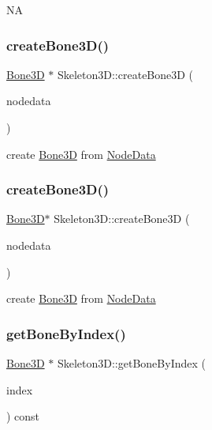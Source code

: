 NA \mbox{\label{classSkeleton3D_a478970d2b905bd5ea08e6cb175845573}} 
\subsubsection{\texorpdfstring{create\+Bone3\+D()}{createBone3D()}\hspace{0.1cm}{\footnotesize\ttfamily [1/2]}}
{\footnotesize\ttfamily \hyperlink{classBone3D}{Bone3D} $\ast$ Skeleton3\+D\+::create\+Bone3D (\begin{DoxyParamCaption}\item[{const \hyperlink{structNodeData}{Node\+Data} \&}]{nodedata }\end{DoxyParamCaption})}

create \hyperlink{classBone3D}{Bone3D} from \hyperlink{structNodeData}{Node\+Data} \mbox{\label{classSkeleton3D_a0438e32f80ad0bc06cf0617cc0a7965b}} 
\subsubsection{\texorpdfstring{create\+Bone3\+D()}{createBone3D()}\hspace{0.1cm}{\footnotesize\ttfamily [2/2]}}
{\footnotesize\ttfamily \hyperlink{classBone3D}{Bone3D}$\ast$ Skeleton3\+D\+::create\+Bone3D (\begin{DoxyParamCaption}\item[{const \hyperlink{structNodeData}{Node\+Data} \&}]{nodedata }\end{DoxyParamCaption})}

create \hyperlink{classBone3D}{Bone3D} from \hyperlink{structNodeData}{Node\+Data} \mbox{\label{classSkeleton3D_a336bc5a9523bb802d0e4369216757612}} 
\subsubsection{\texorpdfstring{get\+Bone\+By\+Index()}{getBoneByIndex()}\hspace{0.1cm}{\footnotesize\ttfamily [1/2]}}
{\footnotesize\ttfamily \hyperlink{classBone3D}{Bone3D} $\ast$ Skeleton3\+D\+::get\+Bone\+By\+Index (\begin{DoxyParamCaption}\item[{unsigned int}]{index }\end{DoxyParamCaption}) const}

